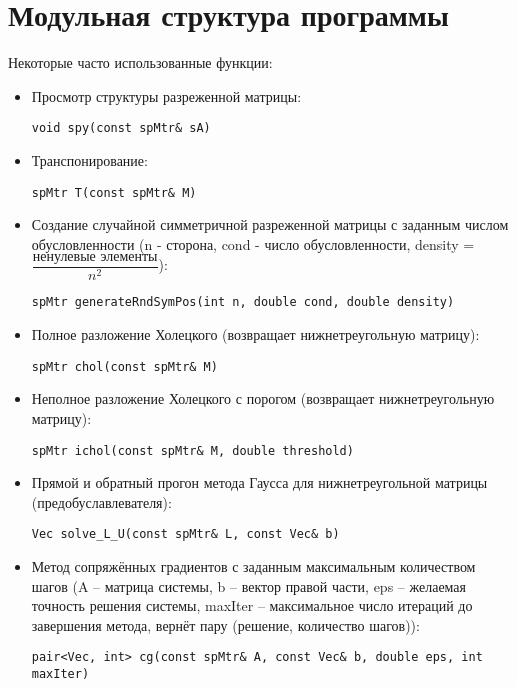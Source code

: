 \section{Модульная структура программы}
Некоторые часто использованные функции:
\begin{itemize}

\item Просмотр структуры разреженной матрицы:

\lstinline|void spy(const spMtr& sA)|\\

\item Транспонирование:

\lstinline|spMtr T(const spMtr& M)|\\

\item Создание случайной симметричной разреженной матрицы с заданным числом обусловленности (n - сторона, cond - число обусловленности, density = $\dfrac{\text{ненулевые элементы}}{n^2}$):

\lstinline|spMtr generateRndSymPos(int n, double cond, double density)|\\

\item Полное разложение Холецкого (возвращает нижнетреугольную матрицу):

\lstinline|spMtr chol(const spMtr& M)|\\

\item Неполное разложение Холецкого с порогом (возвращает нижнетреугольную матрицу):

\lstinline|spMtr ichol(const spMtr& M, double threshold)|\\

\item Прямой и обратный прогон метода Гаусса для нижнетреугольной матрицы (предобуславлевателя):

\lstinline|Vec solve_L_U(const spMtr& L, const Vec& b)|\\

\item Метод сопряжённых градиентов с заданным максимальным количеством шагов (A -- матрица системы, b -- вектор правой части, eps -- желаемая точность решения системы, maxIter -- максимальное число итераций до завершения метода, вернёт пару (решение, количество шагов)):

\lstinline|pair<Vec, int> cg(const spMtr& A, const Vec& b, double eps, int maxIter)|\\


\end{itemize}
